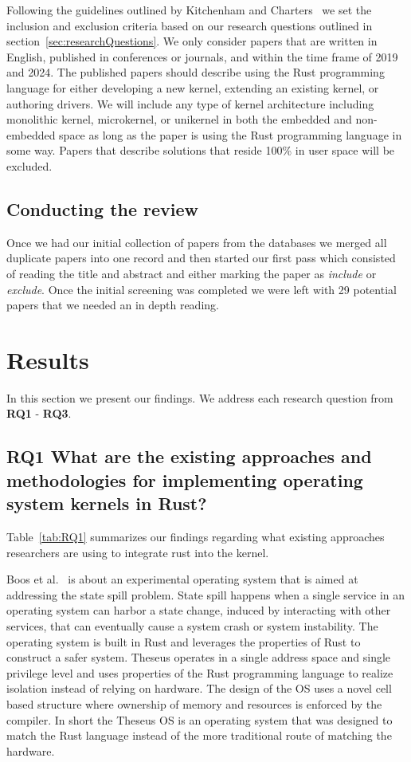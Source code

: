 \documentclass[sigconf]{acmart}
\begin{document}
Following the guidelines outlined by Kitchenham and Charters~\cite{Stuart2007-cc} we set the inclusion and exclusion criteria based on our research questions outlined in section~\ref{sec:researchQuestions}. We only consider papers that are written in English, published in conferences or journals, and within the time frame of 2019 and 2024. The published papers should describe using the Rust programming language for either developing a new kernel, extending an existing kernel, or authoring drivers. We will include any type of kernel architecture including monolithic kernel, microkernel, or unikernel in both the embedded and non-embedded space as long as the paper is using the Rust programming language in some way. Papers that describe solutions that reside 100\% in user space will be excluded.

\subsection{Conducting the review}

Once we had our initial collection of papers from the databases we merged all duplicate papers into one record and then started our first pass which consisted of reading the title and abstract and either marking the paper as \textit{include} or \textit{exclude}. Once  the initial screening was completed we were left with 29 potential papers that we needed an in depth reading.

\section{Results}

In this section we present our findings. We address each research question from \textbf{RQ1} - \textbf{RQ3}.

\subsection{RQ1 What are the existing approaches and methodologies for implementing operating system kernels in Rust?}

Table~\ref{tab:RQ1} summarizes our findings regarding what existing approaches researchers are using to integrate rust into the kernel.

Boos et al.~\cite{Boos2020-zh} is about an experimental operating system that is aimed at addressing the state spill problem. State spill happens when a single service in an operating system can harbor a state change, induced by interacting with other services, that can eventually cause a system crash or system instability. The operating system is built in Rust and leverages the properties of Rust to construct a safer system. Theseus operates in a single address space and single privilege level and uses properties of the Rust programming language to realize isolation instead of relying on hardware. The design of the OS uses a novel cell based structure where ownership of memory and resources is enforced by the compiler. In short the Theseus OS is an operating system that was designed to match the Rust language instead of the more traditional route of matching the hardware.
\end{document}
